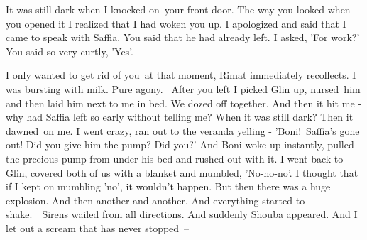 \documentclass[twoside,11pt]{book}
\begin{document}
{\textquotedbl}It was still dark when I knocked on\ your front door. The way you looked when you opened it I realized
that I had woken you up. I apologized and said that I came to speak with Saffia. You said that he had already left. I
asked, 'For work?' You said so very curtly, 'Yes'.{\textquotedbl} 

{\textquotedbl}I only wanted to get rid of you\ at that moment,{\textquotedbl} Rimat immediately recollects.
{\textquotedbl}I was bursting with milk. Pure agony. ~After you left I picked Glin up, nursed{\ }him and
then laid him next to me in bed. We dozed off together. And then it hit me - why had Saffia left so early without
telling me? When it was still dark? Then it dawned{\ }on me. I went crazy, ran out to the veranda
yelling - 'Boni!\ Saffia's gone out! Did you give him the pump? Did you?' And Boni woke up instantly, pulled the
precious pump from under his bed and rushed out with it. I went back to Glin, covered both of us with a blanket and
mumbled, 'No-no-no'. I thought that if I kept on mumbling 'no', it wouldn't happen. But then there was a huge
explosion. And then another and another. And everything started to shake.\ \ Sirens wailed from all directions. And
suddenly Shouba appeared. And I let out a scream that has never stopped\ {}--{\textquotedbl}
\end{document}
